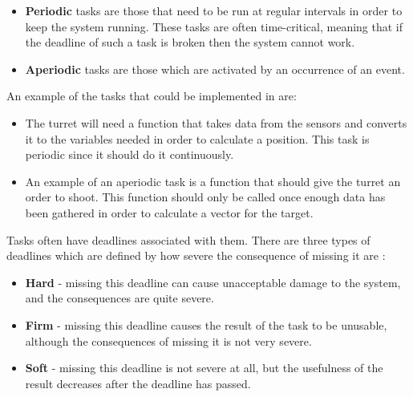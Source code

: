 \begin{itemize}
  \item \textbf{Periodic} tasks are those that need to be run at regular
  intervals in order to keep the system running. These tasks are often
  time-critical, meaning that if the deadline of such a task is broken then the
  system cannot work.
  \item \textbf{Aperiodic} tasks are those which are activated by an occurrence
  of an event.
\end{itemize}

An example of the tasks that could be implemented in \name are:
\begin{itemize}
  \item The turret will need a function that takes data from the sensors and
  converts it to the variables needed in order to calculate a position. This
  task is periodic since it should do it continuously.
  \item An example of an aperiodic task is a function that should give the
  turret an order to shoot. This function should only be called once enough data has
  been gathered in order to calculate a vector for the target.
\end{itemize}

Tasks often have deadlines associated with them. There are three types of
deadlines which are defined by how severe the consequence of missing it are
\citep[ch.1A]{Realtime}:

\begin{itemize}
  \item \textbf{Hard} - missing this deadline can cause unacceptable damage
  to the system, and the consequences are quite severe.
  \item \textbf{Firm} - missing this deadline causes the result of the task to
  be unusable, although the consequences of missing it is not very severe.
  \item \textbf{Soft} - missing this deadline is not severe at all, but the
  usefulness of the result decreases after the deadline has passed.
\end{itemize}

